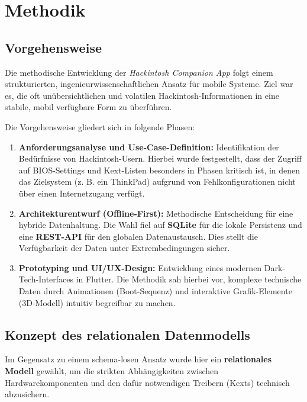 \chapter{Methodik} %
\label{sec:methodik}

\section{Vorgehensweise}
Die methodische Entwicklung der \textit{Hackintosh Companion App} folgt einem strukturierten, ingenieurwissenschaftlichen Ansatz für mobile Systeme. Ziel war es, die oft unübersichtlichen und volatilen Hackintosh-Informationen in eine stabile, mobil verfügbare Form zu überführen. 

Die Vorgehensweise gliedert sich in folgende Phasen:

\begin{enumerate}
    \item \textbf{Anforderungsanalyse und Use-Case-Definition:}  
    Identifikation der Bedürfnisse von Hackintosh-Usern. Hierbei wurde festgestellt, dass der Zugriff auf BIOS-Settings und Kext-Listen besonders in Phasen kritisch ist, in denen das Zielsystem (z. B. ein ThinkPad) aufgrund von Fehlkonfigurationen nicht über einen Internetzugang verfügt.
    
    \item \textbf{Architekturentwurf (Offline-First):}  
    Methodische Entscheidung für eine hybride Datenhaltung. Die Wahl fiel auf \textbf{SQLite} für die lokale Persistenz und eine \textbf{REST-API} für den globalen Datenaustausch. Dies stellt die Verfügbarkeit der Daten unter Extrembedingungen sicher.
    
    \item \textbf{Prototyping und UI/UX-Design:}  
    Entwicklung eines modernen Dark-Tech-Interfaces in Flutter. Die Methodik sah hierbei vor, komplexe technische Daten durch Animationen (Boot-Sequenz) und interaktive Grafik-Elemente (3D-Modell) intuitiv begreifbar zu machen.
\end{enumerate}

\section{Konzept des relationalen Datenmodells}
Im Gegensatz zu einem schema-losen Ansatz wurde hier ein \textbf{relationales Modell} gewählt, um die strikten Abhängigkeiten zwischen Hardwarekomponenten und den dafür notwendigen Treibern (Kexts) technisch abzusichern.

